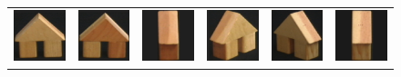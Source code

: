 \begin{figure}[p]
\begin{center}
\begin{tabular}{cccccc}
\includegraphics[width=2cm]{coil/beeld-42.eps} &
\includegraphics[width=2cm]{coil/beeld-43.eps} &
\includegraphics[width=2cm]{coil/beeld-44.eps} &
\includegraphics[width=2cm]{coil/beeld-45.eps} &
\includegraphics[width=2cm]{coil/beeld-46.eps} &
\includegraphics[width=2cm]{coil/beeld-47.eps} \\


\end{tabular}
\end{center}
\end{figure}
